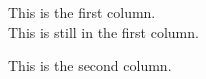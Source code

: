 \begin{minipage}[t]{0.5\textwidth}
This is the first column.\\

This is still in the first column.
\end{minipage}

\begin{minipage}[t]{0.5\textwidth}
This is the second column.
\end{minipage}

